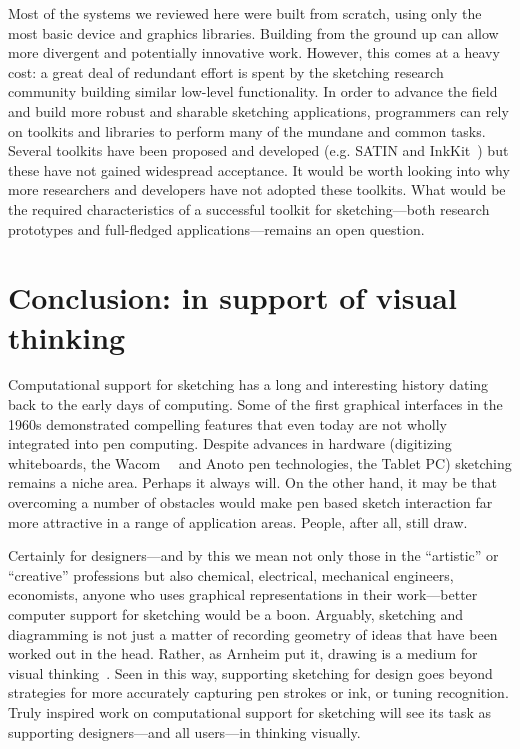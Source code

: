 Most of the systems we reviewed here were built from scratch, using
only the most basic device and graphics libraries. Building from the
ground up can allow more divergent and potentially innovative
work. However, this comes at a heavy cost: a great deal of redundant
effort is spent by the sketching research community building similar
low-level functionality. In order to advance the field and build more
robust and sharable sketching applications, programmers can rely on
toolkits and libraries to perform many of the mundane and common
tasks. Several toolkits have been proposed and developed (e.g. SATIN
and InkKit~\cite{hong-satin,plimmer-inkkit}) but these have not gained
widespread acceptance.  It would be worth looking into why more
researchers and developers have not adopted these toolkits. What would
be the required characteristics of a successful toolkit for
sketching---both research prototypes and full-fledged
applications---remains an open question.

\section{Conclusion: in support of visual thinking}

Computational support for sketching has a long and interesting history
dating back to the early days of computing. Some of the first
graphical interfaces in the 1960s demonstrated compelling features
that even today are not wholly integrated into pen computing. Despite
advances in hardware (digitizing whiteboards, the
Wacom\texttrademark\ ~\cite{wacom} and Anoto pen technologies, the
Tablet PC) sketching remains a niche area. Perhaps it always will. On
the other hand, it may be that overcoming a number of obstacles would
make pen based sketch interaction far more attractive in a range of
application areas. People, after all, still draw.

Certainly for designers---and by this we mean not only those in the
``artistic'' or ``creative'' professions but also chemical,
electrical, mechanical engineers, economists, anyone who uses
graphical representations in their work---better computer support for
sketching would be a boon. Arguably, sketching and diagramming is not
just a matter of recording geometry of ideas that have been worked out
in the head. Rather, as Arnheim put it, drawing is a medium for visual
thinking~\cite{arnheim-visthink}. Seen in this way, supporting
sketching for design goes beyond strategies for more accurately
capturing pen strokes or ink, or tuning recognition. Truly inspired
work on computational support for sketching will see its task as
supporting designers---and all users---in thinking visually.



